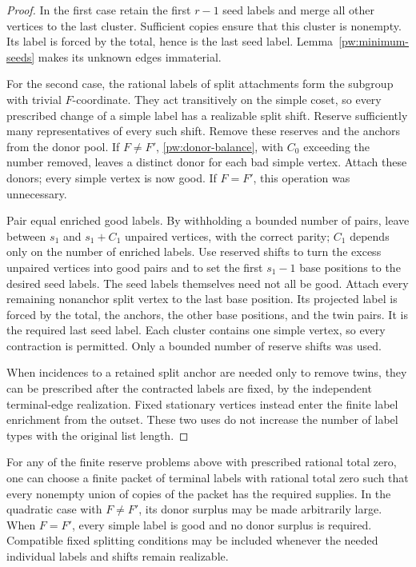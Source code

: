 \begin{proof}
In the first case retain the first $r-1$ seed labels and merge all other
vertices to the last cluster.  Sufficient copies ensure that this cluster
is nonempty.  Its label is forced by the total, hence is the last seed
label.  Lemma~\ref{pw:minimum-seeds} makes its unknown edges immaterial.

For the second case, the rational labels of split attachments form the
subgroup with trivial $F$-coordinate.  They act transitively on the simple
coset, so every prescribed change of a simple label has a realizable split
shift.  Reserve sufficiently many representatives of every such shift.
Remove these reserves and the anchors from the donor pool.  If $F\ne F'$,
\eqref{pw:donor-balance}, with $C_0$ exceeding the number removed, leaves a
distinct donor for each bad simple vertex.  Attach these donors; every
simple vertex is now good.  If $F=F'$, this operation was unnecessary.

Pair equal enriched good labels.  By withholding a bounded number of pairs,
leave between $s_1$ and $s_1+C_1$ unpaired vertices, with the correct parity;
$C_1$ depends only on the number of enriched labels.  Use reserved shifts
to turn the excess unpaired vertices into good pairs and to set the first
$s_1-1$ base positions to the desired seed labels.  The seed labels
themselves need not all be good.  Attach every remaining nonanchor split
vertex to the last base position.  Its projected label is forced by the
total, the anchors, the other base positions, and the twin pairs.  It is
the required last seed label.  Each cluster contains one simple vertex,
so every contraction is permitted.  Only a bounded number of reserve
shifts was used.

When incidences to a retained split anchor are needed only to remove twins,
they can be prescribed after the contracted labels are fixed, by the
independent terminal-edge realization.  Fixed stationary vertices instead
enter the finite label enrichment from the outset.  These two uses do not
increase the number of label types with the original list length.
\end{proof}

\begin{lemma}\label{pw:packets}
For any of the finite reserve problems above with prescribed rational total
zero, one can choose a finite packet of terminal labels with rational total
zero such that every nonempty union of copies of the packet has the required
supplies.  In the quadratic case with \(F\ne F'\), its donor surplus
may be made arbitrarily large.  When \(F=F'\), every simple label is
good and no donor surplus is required.  Compatible fixed splitting
conditions may be included whenever
the needed individual labels and shifts remain realizable.
\end{lemma}

